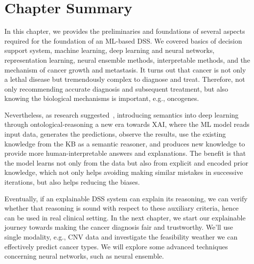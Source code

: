 \section{Chapter Summary}
In this chapter, we provides the preliminaries and foundations of several aspects required for the foundation of an ML-based DSS. We covered basics of decision support system, machine learning, deep learning and neural networks, representation learning, neural ensemble methods, interpretable methods, and the mechanism of cancer growth and metastasis. 
It turns out that cancer is not only a lethal disease but tremendously complex to diagnose and treat. Therefore, not only recommending accurate diagnosis and subsequent treatment, but also knowing the biological mechanisms is important, e.g., oncogenes. 

\hspace*{3.5mm} Nevertheless, as research suggested~\cite{alirezaie2019semantic}, introducing semantics into deep learning through ontological-reasoning a new era towards XAI, where the ML model reads input data, generates the predictions, observe the results, use the existing knowledge from the KB as a semantic reasoner, and produces new knowledge to provide more human-interpretable answers and explanations. The benefit is that the model learns not only from the data but also from explicit and encoded prior knowledge, which not only helps avoiding making similar mistakes in successive iterations, but also helps reducing the biases. 

\hspace*{3.5mm}Eventually, if an explainable DSS system can explain its reasoning, we can verify whether that reasoning is sound with respect to these auxiliary criteria, hence can be used in real clinical setting. In the next chapter, we start our explainable journey towards making the cancer diagnosis fair and trustworthy. We'll use single modality, e.g., CNV data and investigate the feasibility weather we can effectively predict cancer types. We will explore some advanced techniques concerning neural networks, such as neural ensemble. 